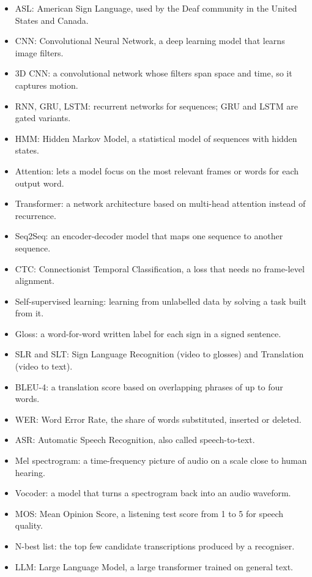 \documentclass{FastFyp}
\begin{document}
\begin{itemize}
  \item ASL: American Sign Language, used by the Deaf community in the United States and Canada.
  \item CNN: Convolutional Neural Network, a deep learning model that learns image filters.
  \item 3D CNN: a convolutional network whose filters span space and time, so it captures motion.
  \item RNN, GRU, LSTM: recurrent networks for sequences; GRU and LSTM are gated variants.
  \item HMM: Hidden Markov Model, a statistical model of sequences with hidden states.
  \item Attention: lets a model focus on the most relevant frames or words for each output word.
  \item Transformer: a network architecture based on multi-head attention instead of recurrence.
  \item Seq2Seq: an encoder-decoder model that maps one sequence to another sequence.
  \item CTC: Connectionist Temporal Classification, a loss that needs no frame-level alignment.
  \item Self-supervised learning: learning from unlabelled data by solving a task built from it.
  \item Gloss: a word-for-word written label for each sign in a signed sentence.
  \item SLR and SLT: Sign Language Recognition (video to glosses) and Translation (video to text).
  \item BLEU-4: a translation score based on overlapping phrases of up to four words.
  \item WER: Word Error Rate, the share of words substituted, inserted or deleted.
  \item ASR: Automatic Speech Recognition, also called speech-to-text.
  \item Mel spectrogram: a time-frequency picture of audio on a scale close to human hearing.
  \item Vocoder: a model that turns a spectrogram back into an audio waveform.
  \item MOS: Mean Opinion Score, a listening test score from 1 to 5 for speech quality.
  \item N-best list: the top few candidate transcriptions produced by a recogniser.
  \item LLM: Large Language Model, a large transformer trained on general text.
\end{itemize}
\end{document}
